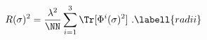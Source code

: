 \begin{equation}
R(\sigma)^2={\lambda^2\over \NN}\sum_{i=1}^3\Tr[\Phi^i(\sigma)^2]\
. \labell{radii}
\end{equation}

